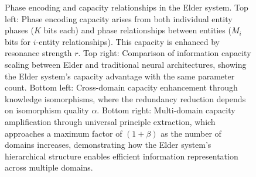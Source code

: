 \begin{figure}[t]
\caption{Phase encoding and capacity relationships in the Elder system. Top left: Phase encoding capacity arises from both individual entity phases ($K$ bits each) and phase relationships between entities ($M_i$ bits for $i$-entity relationships). This capacity is enhanced by resonance strength $r$. Top right: Comparison of information capacity scaling between Elder and traditional neural architectures, showing the Elder system's capacity advantage with the same parameter count. Bottom left: Cross-domain capacity enhancement through knowledge isomorphisms, where the redundancy reduction depends on isomorphism quality $\alpha$. Bottom right: Multi-domain capacity amplification through universal principle extraction, which approaches a maximum factor of $(1 + \beta)$ as the number of domains increases, demonstrating how the Elder system's hierarchical structure enables efficient information representation across multiple domains.}
\label{fig:phase_encoding}
\end{figure}